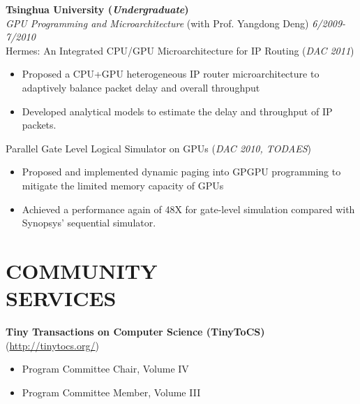 \documentclass[margin, 9pt]{res} %
\begin{document}
\begin{resume}
\bigskip
{\large\textbf{Tsinghua University (\textit{Undergraduate})}}\\

\vspace*{-7pt}
{\large\textit{GPU Programming and Microarchitecture} (with Prof. Yangdong Deng)} \hfill\textit{6/2009-7/2010}\\

\vspace*{-7pt}
Hermes: An Integrated CPU/GPU Microarchitecture for IP Routing \hfill(\textit{DAC 2011})\\
\vspace*{-10pt}
\begin{itemize}[leftmargin=*] \itemsep -3pt
\vspace*{-5pt}
	\item Proposed a CPU+GPU heterogeneous IP router microarchitecture to adaptively balance packet delay and overall throughput
	\item Developed analytical models to estimate the delay and throughput of IP packets.
\end{itemize}

\medskip
Parallel Gate Level Logical Simulator on GPUs \hfill(\textit{DAC 2010, TODAES})\\
\vspace*{-10pt}
\begin{itemize}[leftmargin=*] \itemsep -3pt
\vspace*{-5pt}
	\item Proposed and implemented dynamic paging into GPGPU programming to mitigate the limited memory capacity of GPUs
	\item Achieved a performance again of 48X for gate-level simulation compared with Synopsys' sequential simulator.
\end{itemize}


\section{COMMUNITY\\ SERVICES}

\textbf{Tiny Transactions on Computer Science (TinyToCS)} (\url{http://tinytocs.org/})
\begin{itemize}[leftmargin=*] \itemsep -3pt
\vspace*{-4pt}
	\item Program Committee Chair, Volume IV \par
	\item Program Committee Member, Volume III \par
\end{itemize}


\end{resume}
\end{document}
